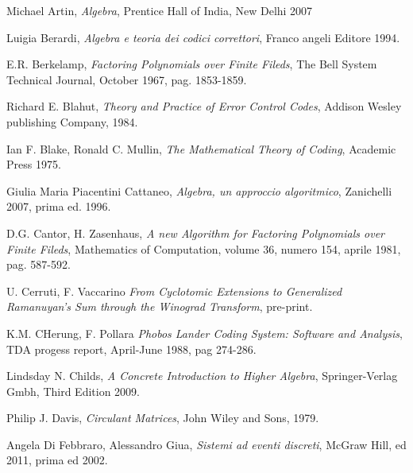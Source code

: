 \newpage

\begin{thebibliography}{25}

Michael Artin, \emph{Algebra}, Prentice Hall of India, New Delhi 2007

Luigia Berardi, \emph{Algebra e teoria dei codici correttori}, Franco angeli
Editore 1994.

E.R. Berkelamp, \emph{Factoring Polynomials over Finite Fileds},
The Bell System Technical Journal, October 1967, pag. 1853-1859.

Richard E. Blahut, \emph{Theory and Practice of Error Control Codes},
Addison Wesley publishing Company, 1984.

Ian F. Blake, Ronald C. Mullin, \emph{The Mathematical Theory of Coding},
Academic Press 1975.



Giulia Maria Piacentini Cattaneo, \emph{Algebra, un approccio algoritmico},
Zanichelli 2007, prima ed. 1996.

D.G. Cantor, H. Zasenhaus, \emph{A new Algorithm for Factoring Polynomials over Finite Fileds},
Mathematics of Computation, volume 36, numero 154, aprile 1981, pag. 587-592.


 U. Cerruti, F. Vaccarino \emph{From Cyclotomic Extensions to Generalized
 Ramanuyan's Sum through the Winograd Transform}, pre-print.

K.M. CHerung, F. Pollara \emph{Phobos Lander Coding System: Software and Analysis},
TDA progess report, April-June 1988, pag 274-286.



Lindsday N. Childs, \emph{A Concrete Introduction to Higher Algebra},
Springer-Verlag Gmbh, Third Edition 2009.

Philip J. Davis, \emph{Circulant Matrices},
John Wiley and Sons, 1979.

Angela Di Febbraro, Alessandro Giua, \emph{Sistemi ad eventi discreti},
McGraw Hill, ed 2011, prima ed 2002.


\end{thebibliography}
